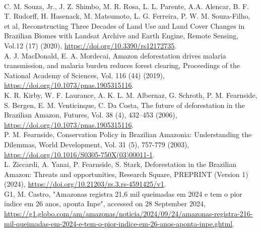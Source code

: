 \documentclass[a4paper,fleqn]{cas-dc}
\begin{document}
\begin{thebibliography}{00}
\\
  C. M. Souza, Jr., J. Z. Shimbo,  M. R. Rosa,  L. L. Parente, A.A.  Alencar,  B. F. T. Rudorff, H. Hasenack, M. Matsumoto, L. G. Ferreira, P. W. M. Souza-Filho, et al, Reconstructing Three Decades of Land Use and Land Cover Changes in Brazilian Biomes with Landsat Archive and Earth Engine, Remote Sensing, Vol.12 (17) (2020), \href{https://doi.org/10.3390/rs12172735}{https://doi.org/10.3390/rs12172735}.
\\
 A. J. MacDonald, E. A. Mordecai, Amazon deforestation drives malaria transmission, and malaria burden reduces forest clearing, Proceedings of the National Academy of Sciences, Vol. 116 (44) (2019), \href{https://doi.org/10.1073/pnas.1905315116}{https://doi.org/10.1073/pnas.1905315116}.
\\
 K. R. Kirby, W. F. Laurance, A. K. L. M.  Albernaz, G. Schroth, P. M. Fearnside, S. Bergen, E. M. Venticinque, C. Da Costa, The future of deforestation in the Brazilian Amazon, Futures, Vol. 38 (4), 432–453 (2006), \href{https://doi.org/10.1073/pnas.1905315116}{https://doi.org/10.1073/pnas.1905315116}.
\\
 P. M. Fearnside, Conservation Policy in Brazilian Amazonia: Understanding the Dilemmas, World Development, Vol. 31 (5), 757-779 (2003), \href{https://doi.org/10.1016/S0305-750X(03)00011-1}{https://doi.org/10.1016/S0305-750X(03)00011-1}.
\\
 L. Ziccardi, A. Yanai, P. Fearnside, S. Stark, Deforestation in the Brazilian Amazon: Threats and opportunities, Research Square, PREPRINT (Version 1) (2024), \href{https://doi.org/10.21203/rs.3.rs-4591425/v1}{https://doi.org/10.21203/rs.3.rs-4591425/v1}.
\\
 G1, M. Castro, "Amazonas registra 21,6 mil queimadas em 2024 e tem o pior índice em 26 anos, aponta Inpe", accessed on 28 September 2024, \href{https://g1.globo.com/am/amazonas/noticia/2024/09/24/amazonas-registra-216-mil-queimadas-em-2024-e-tem-o-pior-indice-em-26-anos-aponta-inpe.ghtml}{https://g1.globo.com/am/amazonas/noticia/2024/09/24/amazonas-registra-216-mil-queimadas-em-2024-e-tem-o-pior-indice-em-26-anos-aponta-inpe.ghtml}.
\\



\end{thebibliography}
\end{document}
